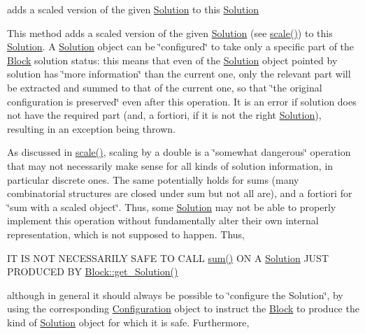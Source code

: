 adds a scaled version of the given \mbox{\hyperlink{class_s_m_spp__di__unipi__it_1_1_solution}{Solution}} to this \mbox{\hyperlink{class_s_m_spp__di__unipi__it_1_1_solution}{Solution}} 

This method adds a scaled version of the given \mbox{\hyperlink{class_s_m_spp__di__unipi__it_1_1_solution}{Solution}} (see \mbox{\hyperlink{class_s_m_spp__di__unipi__it_1_1_m_c_f_solution_a2c818cbb6d8b22f839a7f7336f6b382b}{scale()}}) to this \mbox{\hyperlink{class_s_m_spp__di__unipi__it_1_1_solution}{Solution}}. A \mbox{\hyperlink{class_s_m_spp__di__unipi__it_1_1_solution}{Solution}} object can be \char`\"{}configured\char`\"{} to take only a specific part of the \mbox{\hyperlink{class_s_m_spp__di__unipi__it_1_1_block}{Block}} solution status\+: this means that even of the \mbox{\hyperlink{class_s_m_spp__di__unipi__it_1_1_solution}{Solution}} object pointed by solution has \char`\"{}more information\char`\"{} than the current one, only the relevant part will be extracted and summed to that of the current one, so that \char`\"{}the original configuration is preserved\char`\"{} even after this operation. It is an error if solution does not have the required part (and, a fortiori, if it is not the right \mbox{\hyperlink{class_s_m_spp__di__unipi__it_1_1_solution}{Solution}}), resulting in an exception being thrown.

As discussed in \mbox{\hyperlink{class_s_m_spp__di__unipi__it_1_1_m_c_f_solution_a2c818cbb6d8b22f839a7f7336f6b382b}{scale()}}, scaling by a double is a \char`\"{}somewhat dangerous\char`\"{} operation that may not necessarily make sense for all kinds of solution information, in particular discrete ones. The same potentially holds for sums (many combinatorial structures are closed under sum but not all are), and a fortiori for \char`\"{}sum with a scaled object\char`\"{}. Thus, some \mbox{\hyperlink{class_s_m_spp__di__unipi__it_1_1_solution}{Solution}} may not be able to properly implement this operation without fundamentally alter their own internal representation, which is not supposed to happen. Thus,

IT IS N\+OT N\+E\+C\+E\+S\+S\+A\+R\+I\+LY S\+A\+FE TO C\+A\+LL \mbox{\hyperlink{class_s_m_spp__di__unipi__it_1_1_m_c_f_solution_ac91491316467fa9925f2c8e8fc08f4c1}{sum()}} ON A \mbox{\hyperlink{class_s_m_spp__di__unipi__it_1_1_solution}{Solution}} J\+U\+ST P\+R\+O\+D\+U\+C\+ED BY \mbox{\hyperlink{class_s_m_spp__di__unipi__it_1_1_block_a1db67c2f65111af4314e79dfc81ba597}{Block\+::get\+\_\+\+Solution()}}

although in general it should always be possible to \char`\"{}configure the
\+Solution\char`\"{}, by using the corresponding \mbox{\hyperlink{class_s_m_spp__di__unipi__it_1_1_configuration}{Configuration}} object to instruct the \mbox{\hyperlink{class_s_m_spp__di__unipi__it_1_1_block}{Block}} to produce the kind of \mbox{\hyperlink{class_s_m_spp__di__unipi__it_1_1_solution}{Solution}} object for which it is safe. Furthermore,

